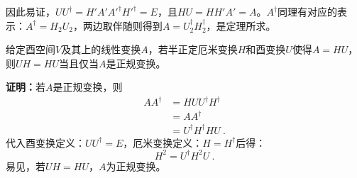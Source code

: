 因此易证，$UU^{\dagger}=H'A'A'^{\dagger}H'^{\dagger}=E$，且$HU=HH'A'=A$。$A^{\dagger}$同理有对应的表示：$A^{\dagger}=H_2U_2$，两边取伴随则得到$A=U_2^{\dagger}H^{\dagger}_2$，是定理所求。


\begin{theorem}{}\label{the_PoDe_1}
给定酉空间$V$及其上的线性变换$A$，若半正定厄米变换$H$和酉变换$U$使得$A=HU$，则$UH=HU$当且仅当$A$是正规变换。
\end{theorem}
\textbf{证明：}若$A$是正规变换，则
\begin{equation}
\begin{aligned}
AA^{\dagger}&=HUU^{\dagger}H^{\dagger}\\
&=AA^{\dagger}\\
&=U^{\dagger}H^{\dagger}HU~.
\end{aligned}
\end{equation}
代入酉变换定义：$UU^{\dagger}=E$，厄米变换定义：$H=H^{\dagger}$后得：
\begin{equation}\label{eq_PoDe_1}
H^2=U^{\dagger}H^2U~.
\end{equation}
易见，若$UH=HU$，$A$为正规变换。

